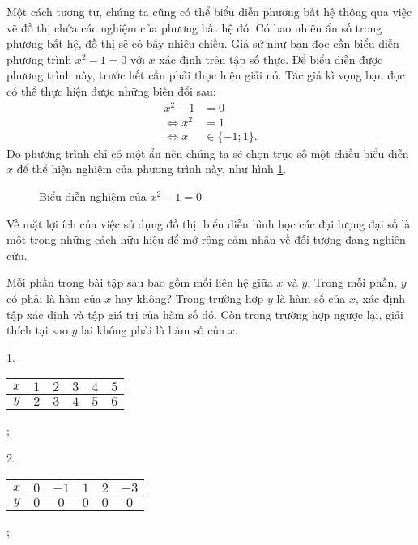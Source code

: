 Một cách tương tự, chúng ta cũng có thể biểu diễn phương bất hệ thông qua việc vẽ đồ thị chứa các nghiệm của phương bất hệ đó. Có bao nhiêu ẩn số trong phương bất hệ, đồ thị sẽ có bấy nhiêu chiều. Giả sử như bạn đọc cần biểu diễn phương trình $x^2 - 1 = 0$ với $x$ xác định trên tập số thực. Để biểu diễn được phương trình này, trước hết cần phải thực hiện giải nó. Tác giả kì vọng bạn đọc có thể thực hiện được những biến đổi sau:
\begin{align*}
   x^2 - 1 &= 0 \\
   \iff x^2 &= 1 \\
   \iff x &\in \{-1; 1\}.
\end{align*}
Do phương trình chỉ có một ẩn nên chúng ta sẽ chọn trục số một chiều biểu diễn $x$ để thể hiện nghiệm của phương trình này, như hình \ref{fig:ham_so_mot_bien:dinh_nghia:vdgpt}.

\begin{figure}[h]
   \centering
   \caption{Biểu diễn nghiệm của $x^2 - 1 = 0$}
   \label{fig:ham_so_mot_bien:dinh_nghia:vdgpt}
\end{figure}

Về mặt lợi ích của việc sử dụng đồ thị, biểu diễn hình học các đại lượng đại số là một trong những cách hữu hiệu để mở rộng cảm nhận về đối tượng đang nghiên cứu.
      
\exercise Mỗi phần trong bài tập sau bao gồm mối liên hệ giữa $x$ và $y$. Trong mỗi phần, $y$ có phải là hàm của $x$ hay không? Trong trường hợp $y$ là hàm số của $x$, xác định tập xác định và tập giá trị của hàm số đó. Còn trong trường hợp ngược lại, giải thích tại sao $y$ lại không phải là hàm số của $x$.

1.
\begin{tabular}{|c|c|c|c|c|c|}
   \hline
   $x$ & $1$ & $2$ & $3$ & $4$ & $5$ \\
   \hline
   $y$ & $2$ & $3$ & $4$ & $5$ & $6$ \\
   \hline
\end{tabular};

2.
\begin{tabular}{|c|c|c|c|c|c|}
   \hline
   $x$ & $0$ & $-1$ & $1$ & $2$ & $-3$ \\
   \hline
   $y$ & $0$ & $0$ & $0$ & $0$ & $0$ \\
   \hline
\end{tabular};


